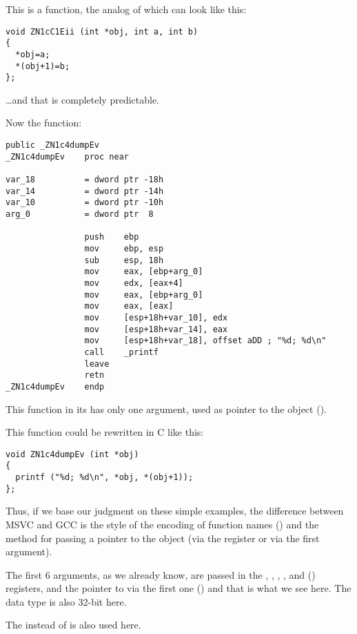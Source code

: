 This is a function, the analog of which can look like this:

\begin{lstlisting}[style=customc]
void ZN1cC1Eii (int *obj, int a, int b)
{
  *obj=a;
  *(obj+1)=b;
};
\end{lstlisting}

\dots and that is completely predictable.

Now the  function:

\begin{lstlisting}[style=customasm]
                public _ZN1c4dumpEv
_ZN1c4dumpEv    proc near

var_18          = dword ptr -18h
var_14          = dword ptr -14h
var_10          = dword ptr -10h
arg_0           = dword ptr  8

                push    ebp
                mov     ebp, esp
                sub     esp, 18h
                mov     eax, [ebp+arg_0]
                mov     edx, [eax+4]
                mov     eax, [ebp+arg_0]
                mov     eax, [eax]
                mov     [esp+18h+var_10], edx
                mov     [esp+18h+var_14], eax
                mov     [esp+18h+var_18], offset aDD ; "%d; %d\n"
                call    _printf
                leave
                retn
_ZN1c4dumpEv    endp
\end{lstlisting}

This function in its  has only one argument, 
used as pointer to the object (\ITthis).

This function could be rewritten in C like this:

\begin{lstlisting}[style=customc]
void ZN1c4dumpEv (int *obj)
{
  printf ("%d; %d\n", *obj, *(obj+1));
};
\end{lstlisting}

Thus, if we base our judgment on these simple examples, the difference between MSVC and GCC
is the style of the encoding of function names () and the method for passing a pointer to the object
(via the \ECX register or via the first argument).


The first 6 arguments, as we already know, are passed in the \RDI, \RSI, \RDX, \RCX,  and 
 (\SysVABI) registers,
and the pointer to \ITthis via the first one (\RDI) and that is what we see here.
The \Tint data type is also 32-bit here.

The \JMP instead of \RET {} is also used here.




